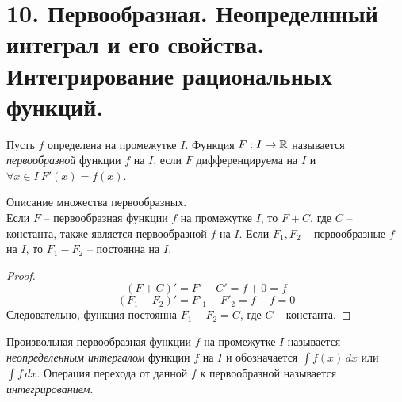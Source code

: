 \section{10. Первообразная. Неопределнный интеграл и его свойства. Интегрирование рациональных функций.}

    \begin{definition}
        Пусть $f$ определена на промежутке $I$. Функция $F: I \to \mathbb{R}$ называется \textit{первообразной}
        функции $f$ на $I$, если $F$ дифференцируема на $I$ и $\forall x \in I \ F'(x) = f(x)$.
    \end{definition}
    
    \begin{theorem}{Описание множества первообразных.}\\
        Если $F$ -- первообразная функции $f$ на промежутке $I$, то $F+C$, где $C$ -- константа,
        также является первообразной $f$ на $I$. Если $F_1, F_2$ -- первообразные $f$ на $I$,
        то $F_1-F_2$ -- постоянна на $I$.
    \end{theorem}
    
    \begin{proof}
        \[(F+C)' = F' + C' = f + 0 = f\]
        \[(F_1 - F_2)' = F'_1 - F'_2 = f - f = 0\]
        Следовательно, функция постоянна $F_1 - F_2 = C$, где $C$ -- константа.
    \end{proof}
    
    \begin{definition}
        Произвольная первообразная функции $f$ на промежутке $I$ называется
        \textit{неопределенным интергалом} функции $f$ на $I$ и обозначается \(\int f(x) \,dx\) или \(\int f \,dx \).
        Операция перехода от данной $f$ к первообразной называется \textit{интегрированием}.
    \end{definition}
    
